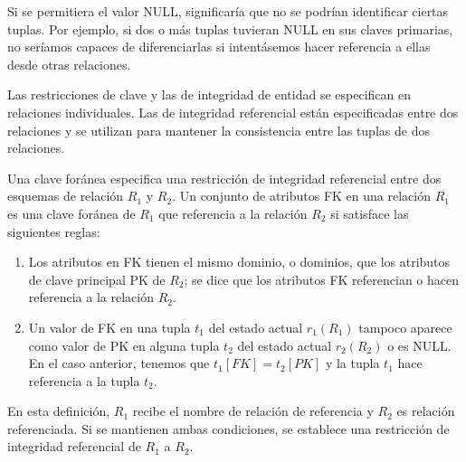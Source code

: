 Si se permitiera el valor NULL, significaría que no se podrían identificar ciertas tuplas. Por ejemplo, si dos o más tuplas tuvieran NULL en sus claves primarias, no seríamos capaces de diferenciarlas si intentásemos hacer referencia a ellas desde otras relaciones.


Las restricciones de clave y las de integridad de entidad se especifican en relaciones individuales. Las de integridad referencial están especificadas entre dos relaciones y se utilizan para mantener la consistencia entre las tuplas de dos relaciones. 


Una clave foránea especifica una restricción de integridad referencial entre dos esquemas de relación $R_1$ y $R_2$. Un conjunto de atributos FK en una relación $R_1$ es una clave foránea de $R_1$ que referencia a la relación $R_2$ si satisface las siguientes reglas:

\begin{enumerate}
    \item  Los atributos en FK tienen el mismo dominio, o dominios, que los atributos de clave principal PK de
    $R_2$; se dice que los atributos FK referencian o hacen referencia a la relación $R_2$.
    \item Un valor de FK en una tupla $t_1$ del estado actual $r_1(R_1)$ tampoco aparece como valor de PK en alguna
    tupla $t_2$ del estado actual $r_2(R_2)$ o es NULL. En el caso anterior, tenemos que $t_1[FK] = t_2 [PK]$ y la tupla $t_1$ hace referencia a la tupla $t_2$.
\end{enumerate}
En esta definición, $R_1$ recibe el nombre de relación de referencia y $R_2$ es relación referenciada. Si se mantienen ambas condiciones, se establece una restricción de integridad referencial de $R_1$ a $R_2$.


